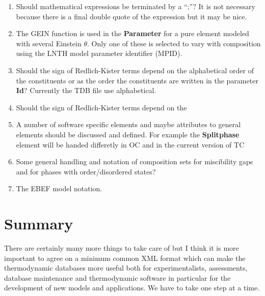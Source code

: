 \documentclass{article}
\begin{document}
\begin{enumerate}
\item Should mathematical expressions be terminated by a ``;''?  It is
  not necessary because there is a final double quote of the expression
  but it may be nice.

\item The GEIN function is used in the {\bf Parameter} for a pure
  element modeled with several Einstein $\theta$.  Only one of these
  is selected to vary with composition using the LNTH model parameter
  identifier (MPID).

\item Should the sign of Redlich-Kister terms depend on the
  alphabetical order of the constituents or as the order the
  constituents are written in the parameter {\bf Id}?  Currently the
  TDB file use alphabetical.

\item Should the sign of Redlich-Kister terms depend on the

\item A number of software specific elements and maybe attributes to
  general elements should be discussed and defined.  For example the
  {\bf Splitphase} element will be handed differetly in OC and in the
  current version of TC

\item Some general handling and notation of composition sets for
  miscibility gaps and for phases with order/disordered states?

\item The EBEF model notation.

\end{enumerate}

\section{Summary}

There are certainly many more things to take care of but I think it is
more important to agree on a minimum common XML format which can make
the thermodynamic databases more useful both for experimentalists,
assessments, database maintenance and thermodynamic software in
particular for the development of new models and applications.  We
have to take one step at a time.
\end{document}
